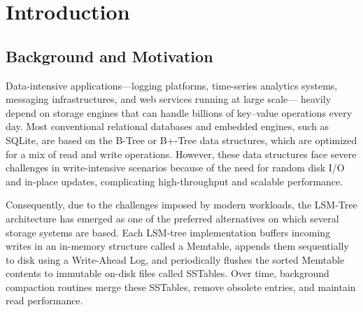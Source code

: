 \documentclass{mnitjaipur}
\begin{document}
\begin{abstract}
Experimental evaluation was conducted using multiple workloads including random, sequential, and level-targeted queries to compare traditional and ML-enhanced storage engine variants. The results demonstrate significant reductions in lookup latency through classifier-assisted level skipping along with substantial memory savings achieved by the Learned Bloom Filter architecture. The project combines concepts from database systems, storage engines, operating systems, and machine learning to provide a compact yet research-oriented implementation of a modern learned storage system.


\vspace{5mm}
\noindent\textbf{Keywords:}
\textit{LSM-Tree; key--value store; LevelDB; compaction; write-ahead log; Bloom filter}

	\end{abstract}

	\roleauthor

	\addcontentpages 


\chapter{Introduction}

\section{Background and Motivation}

Data-intensive applications—logging platforms, time-series analytics systems, messaging infrastructures, and web services running at large scale— heavily depend on storage engines that can handle billions of key–value operations every day. Most conventional relational databases and embedded engines, such as SQLite, are based on the B-Tree or B+-Tree data structures, which are optimized for a mix of read and write operations. However, these data structures face severe challenges in write-intensive scenarios because of the need for random disk I/O and in-place updates, complicating high-throughput and scalable performance.

Consequently, due to the challenges imposed by modern workloads, the LSM-Tree architecture has emerged as one of the preferred alternatives on which several storage systems are based. Each LSM-tree implementation buffers incoming writes in an in-memory structure called a Memtable, appends them sequentially to disk using a Write-Ahead Log, and periodically flushes the sorted Memtable contents to immutable on-disk files called SSTables. Over time, background compaction routines merge these SSTables, remove obsolete entries, and maintain read performance.
\end{document}

